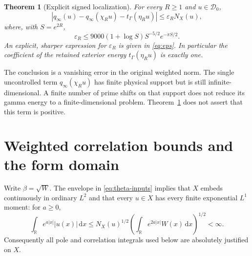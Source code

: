 \documentclass[11pt]{article}
\newtheorem{theorem}{Theorem}[section]
\theoremstyle{remark}\newtheorem{remark}[theorem]{Remark}
\newcommand{\R}{\mathbb R}
\newcommand{\dd}{\,\mathrm d}
\numberwithin{equation}{section}
\begin{document}
\begin{theorem}[Explicit signed localization]\label{thm:main}
For every $R\ge1$ and $u\in\mathcal D_0$,
\begin{equation}\label{eq:main}
 \left|q_\infty(u)-q_\infty(\chi_Ru)-t_\Gamma(\eta_Ru)\right|
 \le\varepsilon_RN_X(u),
\end{equation}
where, with $S=e^{2R}$,
\begin{equation}\label{eq:closed-eps}
 \varepsilon_R\le9000(1+\log S)S^{-5/2}e^{-\pi S/2}.
\end{equation}
An explicit, sharper expression for $\varepsilon_R$ is given in
\eqref{eq:eps}. In particular the coefficient of the retained exterior
energy $t_\Gamma(\eta_Ru)$ is exactly one.
\end{theorem}

The conclusion is a vanishing error in the original weighted norm. The
single uncontrolled term $q_\infty(\chi_Ru)$ has finite physical support
but is still infinite-dimensional. A finite number of prime shifts on
that support does not reduce its gamma energy to a finite-dimensional
problem. Theorem~\ref{thm:main} does not assert that this term is positive.

\section{Weighted correlation bounds and the form domain}\label{sec:domain}

Write $\beta=\sqrt W$. The envelope in \eqref{eq:theta-inputs} implies
that $X$ embeds continuously in ordinary $L^2$ and that every $u\in X$
has every finite exponential $L^1$ moment: for $a\ge0$,
\[
 \int_\R e^{a|x|}|u(x)|\dd x
 \le N_X(u)^{1/2}\left(\int_\R e^{2a|x|}W(x)\dd x\right)^{1/2}<\infty.
\]
Consequently all pole and correlation integrals used below are absolutely
justified on $X$.
\end{document}
